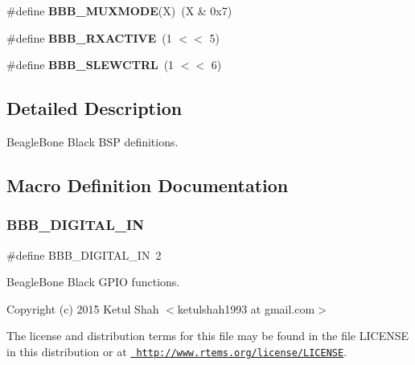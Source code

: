 \begin{DoxyCompactItemize}
\item 
\mbox{\label{bbb-gpio_8h_a920ee55249b00068daeccfd15eae2297}} 
\#define {\bfseries B\+B\+B\+\_\+\+M\+U\+X\+M\+O\+DE}(X)~(X \& 0x7)
\item 
\mbox{\label{bbb-gpio_8h_aedf9830a76d82ce349b53ab4e9d8e0ab}} 
\#define {\bfseries B\+B\+B\+\_\+\+R\+X\+A\+C\+T\+I\+VE}~(1 $<$$<$ 5)
\item 
\mbox{\label{bbb-gpio_8h_aa42ea7ddc1cd5427387c6c53d3036024}} 
\#define {\bfseries B\+B\+B\+\_\+\+S\+L\+E\+W\+C\+T\+RL}~(1 $<$$<$ 6)
\end{DoxyCompactItemize}


\subsection{Detailed Description}
Beagle\+Bone Black B\+SP definitions. 



\subsection{Macro Definition Documentation}
\mbox{\label{bbb-gpio_8h_a34bb5dfdb5fa11fa1320dd657aeaa562}} 
\subsubsection{\texorpdfstring{BBB\_DIGITAL\_IN}{BBB\_DIGITAL\_IN}}
{\footnotesize\ttfamily \#define B\+B\+B\+\_\+\+D\+I\+G\+I\+T\+A\+L\+\_\+\+IN~2}



Beagle\+Bone Black G\+P\+IO functions. 

Copyright (c) 2015 Ketul Shah $<$ketulshah1993 at gmail.\+com$>$

The license and distribution terms for this file may be found in the file L\+I\+C\+E\+N\+SE in this distribution or at \href{http://www.rtems.org/license/LICENSE}{\texttt{ http\+://www.\+rtems.\+org/license/\+L\+I\+C\+E\+N\+SE}}. 